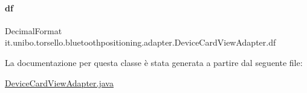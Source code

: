 \paragraph{\texorpdfstring{df}{df}}
{\footnotesize\ttfamily Decimal\+Format it.\+unibo.\+torsello.\+bluetoothpositioning.\+adapter.\+Device\+Card\+View\+Adapter.\+df\hspace{0.3cm}{\ttfamily [private]}}



La documentazione per questa classe è stata generata a partire dal seguente file\+:\begin{DoxyCompactItemize}
\item 
\hyperlink{DeviceCardViewAdapter_8java}{Device\+Card\+View\+Adapter.\+java}\end{DoxyCompactItemize}
